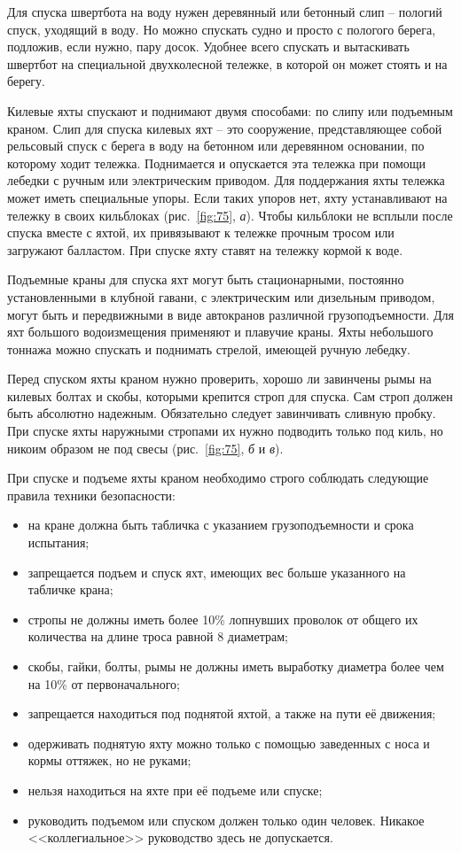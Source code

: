 \documentclass[a4paper, 12pt, twoside, final]{scrbook}
\begin{document}
Для спуска швертбота на воду нужен деревянный или бетонный слип \--- пологий спуск, уходящий в воду. Но можно спускать судно и просто с пологого берега, подложив, если нужно, пару досок. Удобнее всего спускать и вытаскивать швертбот на специальной двухколесной тележке, в которой он может стоять и на берегу.

Килевые яхты спускают и поднимают двумя способами: по слипу или подъемным краном. Слип для спуска килевых яхт \--- это сооружение, представляющее собой рельсовый спуск с берега в воду на бетонном или деревянном основании, по которому ходит тележка. Поднимается и опускается эта тележка при помощи лебедки с ручным или электрическим приводом. Для поддержания яхты тележка может иметь специальные упоры. Если таких упоров нет, яхту устанавливают на тележку в своих кильблоках (рис.~\ref{fig:75}, \textit{а}). Чтобы кильблоки не всплыли после спуска вместе с яхтой, их привязывают к тележке прочным тросом или загружают балластом. При спуске яхту ставят на тележку кормой к воде.

Подъемные краны для спуска яхт могут быть стационарными, постоянно установленными в клубной гавани, с электрическим или дизельным приводом, могут быть и передвижными в виде автокранов различной грузоподъемности. Для яхт большого водоизмещения применяют и плавучие краны. Яхты небольшого тоннажа можно спускать и поднимать стрелой, имеющей ручную лебедку.

Перед спуском яхты краном нужно проверить, хорошо ли завинчены рымы на килевых болтах и скобы, которыми крепится строп для спуска. Сам строп должен быть абсолютно надежным. Обязательно следует завинчивать сливную пробку. При спуске яхты наружными стропами их нужно подводить только под киль, но никоим образом не под свесы (рис.~\ref{fig:75}, \textit{б} и \textit{в}).

При спуске и подъеме яхты краном необходимо строго соблюдать следующие правила техники безопасности: 

\begin{itemize}
\item на кране должна быть табличка с указанием грузоподъемности и срока испытания; 
\item запрещается подъем и спуск яхт, имеющих вес больше указанного на табличке крана; 
\item стропы не должны иметь более 10\% лопнувших проволок от общего их количества на длине троса равной 8 диаметрам; 
\item скобы, гайки, болты, рымы не должны иметь выработку диаметра более чем на 10\% от первоначального; 
\item запрещается находиться под поднятой яхтой, а также на пути её движения; 
\item одерживать поднятую яхту можно только с помощью заведенных с носа и кормы оттяжек, но не руками; 
\item нельзя находиться на яхте при её подъеме или спуске; 
\item руководить подъемом или спуском должен только один человек. Никакое <<коллегиальное>> руководство здесь не допускается. 
\end{itemize}
\end{document}

